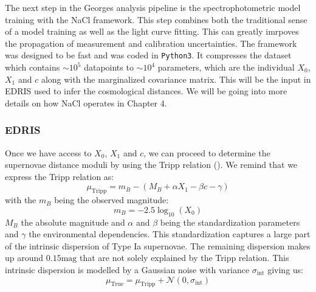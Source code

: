 The next step in the Georges analysis pipeline is the spectrophotometric model training with the NaCl framework.
This step combines both the traditional sense of a model training as well as the light curve fitting. This can greatly imrpoves the propagation of measurement 
and calibration uncertainties. The framework was designed to be fast and was coded in \texttt{Python3}. 
It compresses the dataset which contains $\sim 10^5$ datapoints to $\sim 10^4$ parameters, which are the individual $X_0$, $X_1$ and $c$ along with the marginalized covariance 
matrix. This will be the input in EDRIS used to infer the cosmological distances. 
We will be going into more details on how NaCl operates in Chapter 4. \\

\subsubsection{EDRIS}
Once we have access to $X_0$, $X_1$ and $c$, we can proceed to determine the supernovae distance moduli by using the Tripp relation (\cite{Tripp_1999}). 
We remind that we express the Tripp relation as:
\begin{equation}
    \mu_{\text{Tripp}} = m_B - (M_B + \alpha X_1 - \beta c - \gamma)
    \label{eqn:tripp}
\end{equation}
with the $m_B$ being the observed magnitude:
\begin{equation}
    m_B = -2.5\log_{10}(X_0)
    \label{eqn:mb}
\end{equation}
$M_B$ the absolute magnitude and $\alpha$ and $\beta$ being the standardization parameters and $\gamma$ the environmental dependencies. 
This standardization captures a large part of the intrinsic dispersion of Type Ia supernovae. The remaining dispersion makes up around $0.15\mathrm{mag}$ 
that are not solely explained by the Tripp relation. This intrinsic dispersion is modelled by a Gaussian noise with variance $\sigma_{\text{int}}$ giving us: 
\begin{equation}
    \mu_{\text{True}} = \mu_{\text{Tripp}} + \mathcal{N}(0, \sigma_{\text{int}})
\end{equation}

